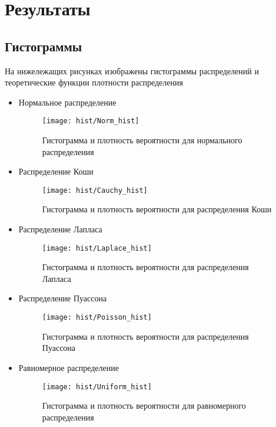 \section{Результаты}
\subsection{Гистограммы}
На нижележащих рисунках изображены гистограммы распределений и теоретические функции плотности распределения

\begin{itemize}
\item{Нормальное распределение}
\begin{figure}[H]
	\begin{center}
		\texttt{[image: hist/Norm\_hist]}
		\caption{Гистограмма и плотность вероятности для нормального распределения} 
		\label{pic:pic_name}
	\end{center}
\end{figure}

\item{Распределение Коши}
\begin{figure}[H]
	\begin{center}
		\texttt{[image: hist/Cauchy\_hist]}
		\caption{Гистограмма и плотность вероятности для распределения Коши} 
		\label{pic:pic_name} 
	\end{center}
\end{figure}

\item{Распределение Лапласа}
\begin{figure}[H]
	\begin{center}
		\texttt{[image: hist/Laplace\_hist]}
		\caption{Гистограмма и плотность вероятности для распределения Лапласа} 
		\label{pic:pic_name} 
	\end{center}
\end{figure}

\item{Распределение Пуассона}
\begin{figure}[H]
	\begin{center}
		\texttt{[image: hist/Poisson\_hist]}
		\caption{Гистограмма и плотность вероятности для распределения Пуассона} 
		\label{pic:pic_name} 
	\end{center}
\end{figure}

\item{Равномерное распределение}
\begin{figure}[H]
	\begin{center}
		\texttt{[image: hist/Uniform\_hist]}
		\caption{Гистограмма и плотность вероятности для равномерного распределения} 
		\label{pic:pic_name}
	\end{center}
\end{figure}
\end{itemize}
